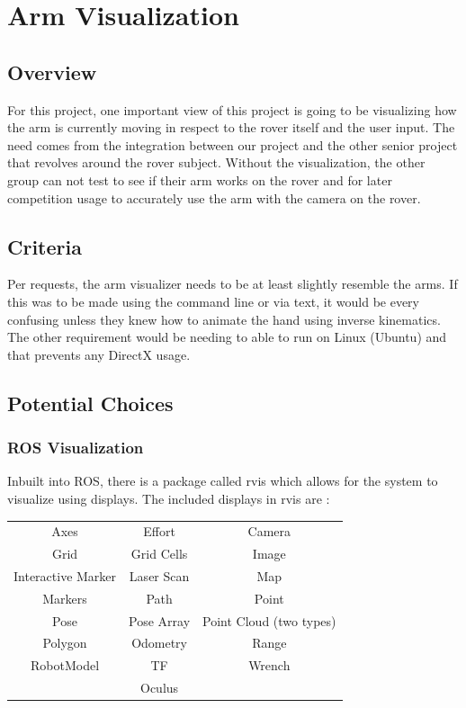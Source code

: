 \documentclass[onecolumn, draftclsnofoot, 10pt, compsoc]{IEEEtran}
\begin{document}
\section{Arm Visualization}
\subsection{Overview}
For this project, one important view of this project is going to be visualizing how the arm is currently moving in respect to the rover itself and the user input.
The need comes from the integration between our project and the other senior project that revolves around the rover subject.
Without the visualization, the other group can not test to see if their arm works on the rover and for later competition usage to accurately use the arm with the camera on the rover. 
\subsection{Criteria}
Per requests, the arm visualizer needs to be at least slightly resemble the arms.
If this was to be made using the command line or via text, it would be every confusing unless they knew how to animate the hand using inverse kinematics.
The other requirement would be needing to able to run on Linux (Ubuntu) and that prevents any DirectX usage.
\subsection{Potential Choices}
\subsubsection{ROS Visualization}
Inbuilt into ROS, there is a package called rvis which allows for the system to visualize using displays.
The included displays in rvis are \cite{rvis}:
\begin{center}
\begin{tabular}{c c c}
Axes & Effort & Camera \\
Grid & Grid Cells & Image \\
Interactive Marker & Laser Scan & Map \\
Markers & Path & Point \\
Pose & Pose Array & Point Cloud (two types)\\
Polygon & Odometry & Range \\
RobotModel & TF & Wrench \\
& Oculus & \\
\end{tabular}
\end{center}
\end{document}
